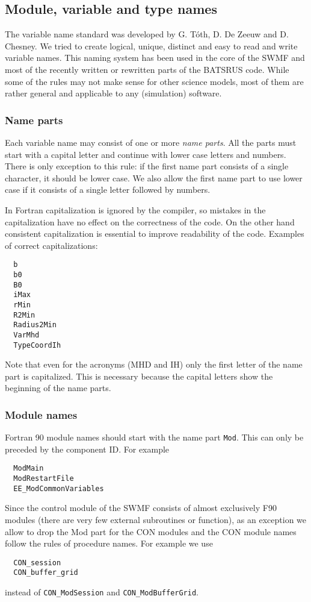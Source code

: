 \documentclass{article}
\begin{document}
\subsection{Module, variable and type names}

The variable name standard was developed by G. T\'oth, D. De Zeeuw
and D. Chesney. We tried to create logical, unique, distinct and easy 
to read and write variable names. This naming system has been used in 
the core of the SWMF and most of the recently written or rewritten parts
of the BATSRUS code. While some of the rules may not make sense for other
science models, most of them are rather general and applicable to any
(simulation) software.

\subsubsection{Name parts}

Each variable name may consist of one or more {\it name parts}.
All the parts must start with a capital letter and continue
with lower case letters and numbers. There is only exception
to this rule: if the first name part consists of a single 
character, it should be lower case. We also allow the first name
part to use lower case if it consists of a single letter followed
by numbers.

In Fortran capitalization is ignored by the compiler, 
so mistakes in the capitalization
have no effect on the correctness of the code. On the other hand
consistent capitalization is essential to improve readability of the code.
Examples of correct capitalizations:
\begin{verbatim}
  b
  b0
  B0
  iMax
  rMin
  R2Min
  Radius2Min
  VarMhd
  TypeCoordIh
\end{verbatim}
Note that even for the acronyms (MHD and IH) 
only the first letter of the name part is capitalized. 
This is necessary because the capital letters show the
beginning of the name parts. 

\subsubsection{Module names}

Fortran 90 module names should start with the name part {\tt Mod}. 
This can only be preceded by the component ID. For example
\begin{verbatim}
  ModMain
  ModRestartFile
  EE_ModCommonVariables
\end{verbatim}
Since the control module of the SWMF consists of almost exclusively 
F90 modules (there are very few external subroutines or function), 
as an exception we allow to drop the Mod part for the CON modules
and the CON module names follow the rules of procedure names.
For example we use
\begin{verbatim}
  CON_session
  CON_buffer_grid
\end{verbatim}
instead of {\tt CON\_ModSession} and {\tt CON\_ModBufferGrid}.
\end{document}
